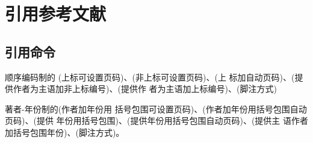 \chapter{引用参考文献}
\label{chap:bibliography}

\section{引用命令}

顺序编码制的 \cite{qiujinhengetal2010,njuthesis,riedl2009quasi}(上标可设置页码)、\parencite{qiujinhengetal2010}(非上标可设置页码)、(上
标加自动页码)、\textcite{qiujinhengetal2010}(提供作者为主语加非上标编号)、(提供作
者为主语加上标编号)、(脚注方式)

著者-年份制的\cite{qiujinhengetal2010,njuthesis,riedl2009quasi}(作者加年份用
括号包围可设置页码)、(作者加年份用括号包围自动页码)、(提供
年份用括号包围)、(提供年份用括号包围自动页码)、\textcite{qiujinhengetal2010}(提供主
语作者加括号包围年份)、(脚注方式)。
